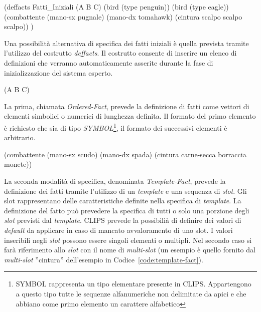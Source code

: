 \begin{program}
\begin{verbatimtab}

(deffacts Fatti_Iniziali
	(A B C)
	(bird (type penguin))
	(bird (type eagle))
	(combattente
		(mano-sx pugnale)
		(mano-dx tomahawk)
		(cintura scalpo scalpo scalpo))
)
\end{verbatimtab}
\caption{Definizione di un gruppo di fatti tramite \emph{deffacts}}\label{code:deffacts}
\end{program}


Una possibilità alternativa di specifica dei fatti iniziali è quella prevista tramite l'utilizzo del costrutto \emph{deffacts}. Il costrutto consente di inserire un elenco di definizioni che verranno automaticamente asserite durante la fase di inizializzazione del sistema esperto.

\begin{program}
\begin{verbatimtab}

(A B C)
\end{verbatimtab}
\caption{Fatto definito utilizzando la notazione \emph{Ordered-Fact}}\label{code:ordered-fact}
\end{program}

La prima, chiamata \emph{Ordered-Fact}, prevede la definizione di fatti come vettori di elementi simbolici o numerici di lunghezza definita. Il formato del primo elemento è richiesto che sia di tipo \emph{SYMBOL}\footnote{SYMBOL rappresenta un tipo elementare presente in CLIPS. Appartengono a questo tipo tutte le sequenze alfanumeriche non delimitate da apici e che abbiano come primo elemento un carattere alfabetico}, il formato dei successivi elementi è arbitrario.

\begin{program}
\begin{verbatimtab}

(combattente
	(mano-sx scudo)
	(mano-dx spada)
	(cintura carne-secca borraccia monete))
\end{verbatimtab}
\caption[Fatto definito utilizzando la notazione \emph{Template-Fact}]{Fatto definito utilizzando la notazione \emph{Template-Fact}. Il nome del template a cui il fatto fa riferimento è \emph{combattente}. La specifica del \emph{template} prevede l'esistenza degli slot ''mano-sx'', ''mano-dx'' e ''cintura''}\label{code:template-fact}
\end{program}

La seconda modalità di specifica, denominata \emph{Template-Fact}, prevede la definizione dei fatti tramite l'utilizzo di un \emph{template} e una sequenza di \emph{slot}. Gli slot rappresentano delle caratteristiche definite nella specifica di \emph{template}.
La definizione del fatto può prevedere la specifica di tutti o solo una porzione degli \emph{slot} previsti dal \emph{template}. CLIPS prevede la possibilià di definire dei valori di \emph{default} da applicare in caso di mancato avvaloramento di uno slot.
I valori inseribili negli \emph{slot} possono essere singoli elementi o multipli. Nel secondo caso si farà riferimento allo \emph{slot} con il nome di \emph{multi-slot} (un esempio è quello fornito dal \emph{multi-slot} ''cintura'' dell'esempio in Codice~\ref{code:template-fact}).

